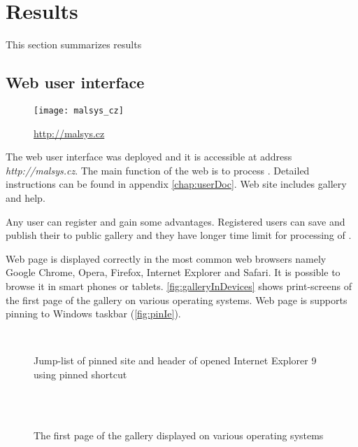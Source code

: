 
\chapter{Results}

This section summarizes results

\section{Web user interface}

\begin{wrapfigure}{r}{0.4\textwidth}
	\texttt{[image: malsys\_cz]}
	\caption{\url{http://malsys.cz}}
	\label{fig:malsysQr}
\end{wrapfigure}

The web user interface was deployed and it is accessible at address \emph{http://malsys.cz}.
The main function of the web is to process \lsystems.
Detailed instructions can be found in appendix \ref{chap:userDoc}.
Web site includes \lsystem gallery and help.

Any user can register and gain some advantages.
Registered users can save and publish their \lsystems to public gallery and they have longer time limit for processing of \lsystems.

Web page is displayed correctly in the most common web browsers namely Google Chrome, Opera, Firefox, Internet Explorer and Safari.
It is possible to browse it in smart phones or tablets.
\autoref{fig:galleryInDevices} shows print-screens of the first page of the gallery on various operating systems.
Web page is supports pinning to Windows taskbar (\autoref{fig:pinIe}). 

\begin{figure}[h]
	\centering
	 ~
	\caption{Jump-list of pinned site and header of opened Internet Explorer 9 using pinned shortcut}
	\label{fig:galleryInDevices}
\end{figure}


\begin{figure}[p]
	\centering
	\\
	 ~
	 ~
	\caption{The first page of the gallery displayed on various operating systems}
	\label{fig:pinIe}
\end{figure}



